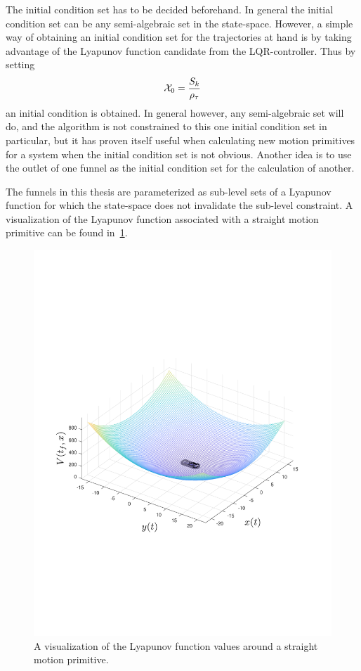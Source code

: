 The initial condition set has to be decided beforehand. In general the initial
condition set can be any semi-algebraic set in the state-space. However, a
simple way of obtaining an initial condition set for the trajectories at hand is
by taking advantage of the Lyapunov function candidate from the
\ac{LQR}-controller. Thus by setting
\begin{equation}
  \mathcal{X}_{0} = \frac{ S_{k}}{\rho_{\tau}}
\end{equation}
an initial condition is obtained. In general however, any semi-algebraic set
will do, and the algorithm is not constrained to this one initial condition set
in particular, but it has proven itself useful when calculating new motion
primitives for a system when the initial condition set is not obvious. Another
idea is to use the outlet of one funnel as the initial condition set for the
calculation of another.

The funnels in this thesis are parameterized as sub-level sets of a Lyapunov
function for which the state-space does not invalidate the sub-level constraint.
A visualization of the Lyapunov function associated with a straight motion
primitive can be found in~\cref{fig:visualized-lyapunov}.
\begin{figure}
  \centering \includegraphics[trim={3cm 7cm 3cm 7cm},
  scale=.6]{figures/rrtfunnel/straight-funnel-lyapunov-3d}
  \caption{A visualization of the Lyapunov function values around a straight
    motion primitive.}
  \label{fig:visualized-lyapunov}
\end{figure}

